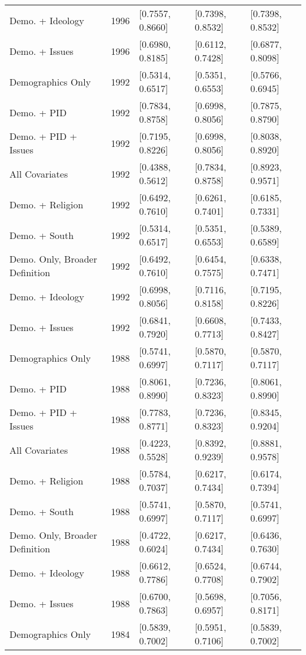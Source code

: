\begin{longtable}{lrlll}
  Demo. + Ideology & 1996 & [0.7557, 0.8660] & [0.7398, 0.8532] & [0.7398, 0.8532] \\ 
  Demo. + Issues & 1996 & [0.6980, 0.8185] & [0.6112, 0.7428] & [0.6877, 0.8098] \\ 
  Demographics Only & 1992 & [0.5314, 0.6517] & [0.5351, 0.6553] & [0.5766, 0.6945] \\ 
  Demo. + PID & 1992 & [0.7834, 0.8758] & [0.6998, 0.8056] & [0.7875, 0.8790] \\ 
  Demo. + PID + Issues & 1992 & [0.7195, 0.8226] & [0.6998, 0.8056] & [0.8038, 0.8920] \\ 
  All Covariates & 1992 & [0.4388, 0.5612] & [0.7834, 0.8758] & [0.8923, 0.9571] \\ 
  Demo. + Religion & 1992 & [0.6492, 0.7610] & [0.6261, 0.7401] & [0.6185, 0.7331] \\ 
  Demo. + South & 1992 & [0.5314, 0.6517] & [0.5351, 0.6553] & [0.5389, 0.6589] \\ 
  Demo. Only, Broader Definition & 1992 & [0.6492, 0.7610] & [0.6454, 0.7575] & [0.6338, 0.7471] \\ 
  Demo. + Ideology & 1992 & [0.6998, 0.8056] & [0.7116, 0.8158] & [0.7195, 0.8226] \\ 
  Demo. + Issues & 1992 & [0.6841, 0.7920] & [0.6608, 0.7713] & [0.7433, 0.8427] \\ 
  Demographics Only & 1988 & [0.5741, 0.6997] & [0.5870, 0.7117] & [0.5870, 0.7117] \\ 
  Demo. + PID & 1988 & [0.8061, 0.8990] & [0.7236, 0.8323] & [0.8061, 0.8990] \\ 
  Demo. + PID + Issues & 1988 & [0.7783, 0.8771] & [0.7236, 0.8323] & [0.8345, 0.9204] \\ 
  All Covariates & 1988 & [0.4223, 0.5528] & [0.8392, 0.9239] & [0.8881, 0.9578] \\ 
  Demo. + Religion & 1988 & [0.5784, 0.7037] & [0.6217, 0.7434] & [0.6174, 0.7394] \\ 
  Demo. + South & 1988 & [0.5741, 0.6997] & [0.5870, 0.7117] & [0.5741, 0.6997] \\ 
  Demo. Only, Broader Definition & 1988 & [0.4722, 0.6024] & [0.6217, 0.7434] & [0.6436, 0.7630] \\ 
  Demo. + Ideology & 1988 & [0.6612, 0.7786] & [0.6524, 0.7708] & [0.6744, 0.7902] \\ 
  Demo. + Issues & 1988 & [0.6700, 0.7863] & [0.5698, 0.6957] & [0.7056, 0.8171] \\ 
  Demographics Only & 1984 & [0.5839, 0.7002] & [0.5951, 0.7106] & [0.5839, 0.7002] \\ 

\end{longtable}
